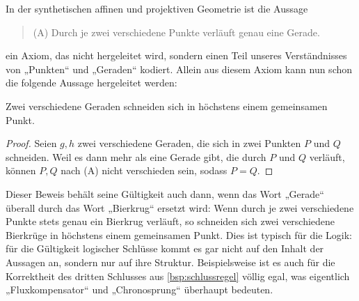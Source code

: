 \begin{bsp}[*]
    In der synthetischen affinen und projektiven Geometrie ist die Aussage
    \begin{quote}
        (A) Durch je zwei verschiedene Punkte verläuft genau eine Gerade.
    \end{quote}
    ein Axiom, das nicht hergeleitet wird, sondern einen Teil unseres Verständnisses von „Punkten“ und „Geraden“ kodiert. Allein aus diesem Axiom kann nun schon die folgende Aussage hergeleitet werden:
    \begin{satz}
        Zwei verschiedene Geraden schneiden sich in höchstens einem gemeinsamen Punkt.
    \end{satz}
    \begin{proof}
        Seien $g,h$ zwei verschiedene Geraden, die sich in zwei Punkten $P$ und $Q$ schneiden. Weil es dann mehr als eine Gerade gibt, die durch $P$ und $Q$ verläuft, können $P,Q$ nach (A) nicht verschieden sein, sodass $P=Q$.
    \end{proof}
\end{bsp}


\begin{bem}[*]
    Dieser Beweis behält seine Gültigkeit auch dann, wenn das Wort „Gerade“ überall durch das Wort „Bierkrug“ ersetzt wird: Wenn durch je zwei verschiedene Punkte stets genau ein Bierkrug verläuft, so schneiden sich zwei verschiedene Bierkrüge in höchstens einem gemeinsamen Punkt. Dies ist typisch für die Logik: für die Gültigkeit logischer Schlüsse kommt es gar nicht auf den Inhalt der Aussagen an, sondern nur auf ihre Struktur. Beispielsweise ist es auch für die Korrektheit des dritten Schlusses aus \cref{bsp:schlussregel} völlig egal, was eigentlich „Fluxkompensator“ und „Chronosprung“ überhaupt bedeuten.
\end{bem}


